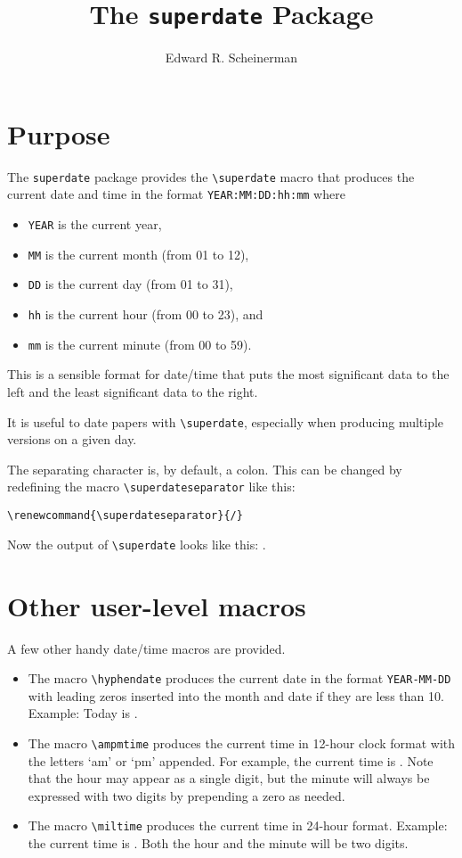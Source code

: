 \documentclass[12pt]{amsart}
\title{The \texttt{superdate} Package}
\author{Edward R. Scheinerman}
\date{\superdate}
\begin{document}
\maketitle

\section{Purpose}

The \verb|superdate| package provides the \verb|\superdate| macro that
produces the current date and time in the format
\verb|YEAR:MM:DD:hh:mm| where
\begin{itemize}
\item \verb|YEAR| is the current year,
\item \verb|MM| is the current month (from 01 to 12),
\item \verb|DD| is the current day (from 01 to 31),
\item \verb|hh| is the current hour (from 00 to 23), and
\item \verb|mm| is the current minute (from 00 to 59).
\end{itemize}

This is a sensible format for date/time that puts the most significant
data to the left and the least significant data to the right.

It is useful to date papers with \verb|\superdate|, especially when
producing multiple versions on a given day.

The separating character is, by default, a colon. This can be changed
by redefining the macro \verb|\superdateseparator| like this:
\begin{verbatim}
\renewcommand{\superdateseparator}{/}
\end{verbatim}
\renewcommand{\superdateseparator}{/}%
Now the output of \verb|\superdate| looks like
this: \superdate.


\section{Other user-level macros}
\label{sect:user}


A few other handy date/time macros are provided.
\begin{itemize}
\item The macro \verb|\hyphendate| produces the current date in the
  format \verb|YEAR-MM-DD| with leading zeros inserted into the month
  and date if they are less than 10. Example: Today is \hyphendate.


\item The macro \verb|\ampmtime| produces the current time in 12-hour
  clock format with the letters `am' or `pm' appended. For example,
  the current time is \ampmtime. Note that the hour may appear as a
  single digit, but the minute will always be expressed with two
  digits by prepending a zero as needed.

\item The macro \verb|\miltime| produces the current time in 24-hour
  format. Example: the current time is \miltime. Both the hour and the
  minute will be two digits.
\end{itemize}
\end{document}
